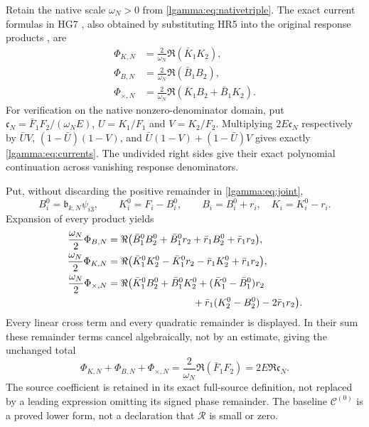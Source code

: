 Retain the native scale $\omega_N>0$ from \eqref{lgamma:eq:nativetriple}.
The exact current formulas in HG7 \cite{lgamma:HG}, also obtained by
substituting HR5 into the original response products \cite{lgamma:HR}, are
\begin{equation}\label{lgamma:eq:currents}
 \begin{aligned}
 \Phi_{K,N}&=\frac2{\omega_N}\Re(\bar K_1K_2),\\
 \Phi_{B,N}&=\frac2{\omega_N}\Re(\bar B_1B_2),\\
 \Phi_{\times,N}&=\frac2{\omega_N}
        \Re(\bar K_1B_2+\bar B_1K_2).
 \end{aligned}
\end{equation}
For verification on the native nonzero-denominator domain, put
$\mathfrak c_N=\bar F_1F_2/(\omega_NE)$, $U=K_1/F_1$ and
$V=K_2/F_2$.  Multiplying $2E\mathfrak c_N$ respectively by
$\bar UV$, $(1-\bar U)(1-V)$, and
$\bar U(1-V)+(1-\bar U)V$ gives exactly
\eqref{lgamma:eq:currents}.  The undivided right sides give their exact
polynomial continuation across vanishing response denominators.

Put, without discarding the positive remainder in \eqref{lgamma:eq:joint},
\[
 B_i^0=\mathfrak b_{k,N}\psi_{i3},\qquad
 K_i^0=F_i-B_i^0,\qquad B_i=B_i^0+r_i,\quad K_i=K_i^0-r_i.
\]
Expansion of every product yields
\begin{equation}\label{lgamma:eq:currentremainders}
 \begin{aligned}
 \frac{\omega_N}2\Phi_{B,N}
 &=\Re\bigl(\bar B_1^0B_2^0+\bar B_1^0r_2
              +\bar r_1B_2^0+\bar r_1r_2\bigr),\\
 \frac{\omega_N}2\Phi_{K,N}
 &=\Re\bigl(\bar K_1^0K_2^0-\bar K_1^0r_2
              -\bar r_1K_2^0+\bar r_1r_2\bigr),\\
 \frac{\omega_N}2\Phi_{\times,N}
 &=\Re\bigl(\bar K_1^0B_2^0+\bar B_1^0K_2^0
       +(\bar K_1^0-\bar B_1^0)r_2\\
 &\hspace{30mm}+\bar r_1(K_2^0-B_2^0)-2\bar r_1r_2\bigr).
 \end{aligned}
\end{equation}
Every linear cross term and every quadratic remainder is displayed.
In their sum these remainder terms cancel algebraically, not by an
estimate, giving the unchanged total
\begin{equation}\label{lgamma:eq:currenttotal}
 \Phi_{K,N}+\Phi_{B,N}+\Phi_{\times,N}
 =\frac2{\omega_N}\Re(\bar F_1F_2)
 =2E\Re\mathfrak c_N.
\end{equation}
The source coefficient is retained in its exact full-source definition,
not replaced by a leading expression omitting its signed phase remainder.
The baseline $\mathcal C^{(0)}$ is a proved lower form, not a declaration
that $\mathcal R$ is small or zero.

